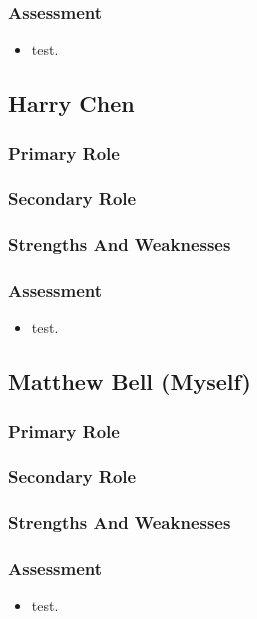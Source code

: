 \documentclass[14pt]{report}
\begin{document}
    \subsubsection*{Assessment}
    \begin{itemize}
      \item test.
    \end{itemize}

    \subsection*{Harry Chen}
    \subsubsection*{Primary Role}
    \subsubsection*{Secondary Role}
    \subsubsection*{Strengths And Weaknesses}
    \subsubsection*{Assessment}
    \begin{itemize}
      \item test.
    \end{itemize}

    \subsection*{Matthew Bell (Myself)}
    \subsubsection*{Primary Role}
    \subsubsection*{Secondary Role}
    \subsubsection*{Strengths And Weaknesses}
    \subsubsection*{Assessment}
    \begin{itemize}
      \item test.
    \end{itemize}
\end{document}
